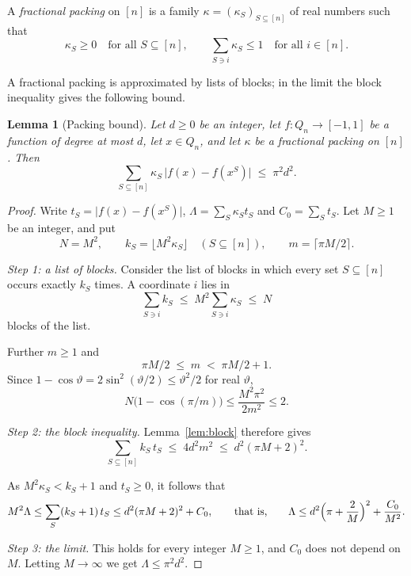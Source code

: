 \documentclass[11pt,reqno]{amsart}
\makeatletter
\newtheorem{lemma}[theorem]{Lemma}
\theoremstyle{definition}
\theoremstyle{remark}
\numberwithin{equation}{section}
\theoremstyle{named}
\theoremstyle{plain}
\renewcommand{\subsection}{\@startsection{subsection}{2}%
  \z@{1.0\linespacing\@plus.4\linespacing\@minus.15\linespacing}{-.5em}{\normalfont\bfseries}}
\newcommand{\abs}[1]{\lvert #1\rvert}
\makeatother
\begin{document}
A \emph{fractional packing} on $[n]$ is a family $\kappa=(\kappa_S)_{S\subseteq[n]}$ of real numbers
such that
\[
   \kappa_S\ge0\quad\text{for all }S\subseteq[n],\qquad
   \sum_{S\ni i}\kappa_S\le1\quad\text{for all }i\in[n].
\]

A fractional packing is approximated by lists of blocks; in the limit the block inequality gives
the following bound.

\begin{lemma}[Packing bound]\label{lem:packing}
Let $d\ge0$ be an integer, let $f\colon Q_n\to[-1,1]$ be a function of degree at most $d$, let
$x\in Q_n$, and let $\kappa$ be a fractional packing on $[n]$. Then
\[
   \sum_{S\subseteq[n]}\kappa_S\,\abs{f(x)-f(x^{S})}\;\le\;\pi^{2}d^{2}.
\]
\end{lemma}

\begin{proof}
Write $t_S=\abs{f(x)-f(x^{S})}$, $\Lambda=\sum_S\kappa_St_S$ and $C_0=\sum_St_S$. Let $M\ge1$ be an
integer, and put
\[
   N=M^{2},\qquad k_S=\lfloor M^{2}\kappa_S\rfloor\quad(S\subseteq[n]),\qquad m=\lceil\pi M/2\rceil .
\]

\smallskip
\emph{Step 1: a list of blocks.} Consider the list of blocks in which every set $S\subseteq[n]$
occurs exactly $k_S$ times. A
coordinate $i$ lies in
\[
   \sum_{S\ni i}k_S\;\le\;M^{2}\sum_{S\ni i}\kappa_S\;\le\;N
\]
blocks of the list.

Further $m\ge1$ and
\[
   \pi M/2\;\le\;m\;<\;\pi M/2+1 .
\]
Since
$1-\cos\vartheta=2\sin^{2}(\vartheta/2)\le\vartheta^{2}/2$ for real $\vartheta$,
\[
   N\bigl(1-\cos(\pi/m)\bigr)\le\frac{M^{2}\pi^{2}}{2m^{2}}\le2 .
\]

\smallskip
\emph{Step 2: the block inequality.} Lemma~\ref{lem:block} therefore gives
\[
   \sum_{S\subseteq[n]}k_S\,t_S\;\le\;4d^{2}m^{2}\;\le\;d^{2}(\pi M+2)^{2}.
\]

As $M^{2}\kappa_S<k_S+1$ and $t_S\ge0$, it follows that
\[
   M^{2}\Lambda\le\sum_S(k_S+1)\,t_S\le d^{2}(\pi M+2)^{2}+C_0,
   \qquad\text{that is,}\qquad
   \Lambda\le d^{2}\Bigl(\pi+\frac2M\Bigr)^{2}+\frac{C_0}{M^{2}} .
\]

\smallskip
\emph{Step 3: the limit.} This holds for every integer $M\ge1$, and $C_0$ does not depend on $M$.
Letting $M\to\infty$ we get
$\Lambda\le\pi^{2}d^{2}$.
\end{proof}

\subsection{Duality}
\end{document}
